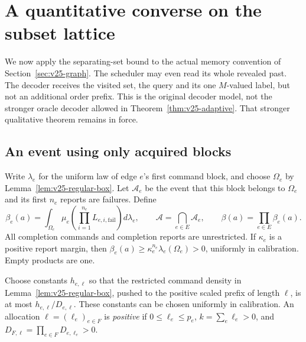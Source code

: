 \section{A quantitative converse on the subset lattice}
\label{sec:v26-capacity}
We now apply the separating-set bound to the actual memory convention
of Section~\ref{sec:v25-graph}. The scheduler may even read its whole
revealed past. The decoder receives the visited set, the query and its
one $M$-valued label, but not an additional order prefix. This is the
original decoder model, not the stronger oracle decoder allowed in
Theorem~\ref{thm:v25-adaptive}. That stronger qualitative theorem
remains in force.

\subsection{An event using only acquired blocks}
Write $\lambda_e$ for the uniform law of edge $e$'s first command
block, and choose $\Omega_e$ by Lemma~\ref{lem:v25-regular-box}.
Let $\mathcal A_e$ be the event that this block belongs to $\Omega_e$
and its first $n_e$ reports are failures. Define
\begin{equation}\label{eq:v26-first-block-mass}
 \beta_e(a)=\int_{\Omega_e}\mu_e\!\left(
       \prod_{i=1}^{n_e}L_{e,i,\mathrm{fail}}\right)d\lambda_e,
 \qquad \mathcal A=\bigcap_{e\in E}\mathcal A_e,
 \qquad \beta(a)=\prod_{e\in E}\beta_e(a).
\end{equation}
All completion commands and completion reports are unrestricted.
If $\kappa_e$ is a positive report margin, then
$\beta_e(a)\ge\kappa_e^{n_e}\lambda_e(\Omega_e)>0$, uniformly in
calibration. Empty products are one.

Choose constants $h_{e,\ell}$ so that the restricted command density
in Lemma~\ref{lem:v25-regular-box}, pushed to the positive scaled
prefix of length $\ell$, is at most $h_{e,\ell}/D_{e,\ell}$.
These constants can be chosen uniformly in calibration.
An allocation $\ell=(\ell_e)_{e\in F}$ is \emph{positive} if
$0\le\ell_e\le p_e$, $k=\sum_e\ell_e>0$, and
$D_{F,\ell}=\prod_{e\in F}D_{e,\ell_e}>0$.

